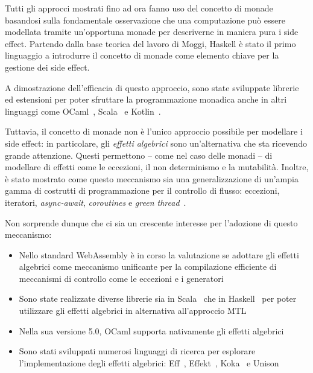 Tutti gli approcci mostrati fino ad ora fanno uso del concetto di monade basandosi sulla fondamentale osservazione che una computazione può essere modellata tramite un'opportuna monade per descriverne in maniera pura i side effect.
Partendo dalla base teorica del lavoro di Moggi, Haskell è stato il primo linguaggio a introdurre il concetto di monade come elemento chiave per la gestione dei side effect.

A dimostrazione dell'efficacia di questo approccio, sono state sviluppate librerie ed estensioni per poter sfruttare la programmazione monadica anche in altri linguaggi come OCaml~\cite{cit:ppx-let}, Scala~\cite{cit:zio,cit:cats} e Kotlin~\cite{cit:arrow-monad-comprehensions}.

Tuttavia, il concetto di monade non è l'unico approccio possibile per modellare i side effect: in particolare, gli \emph{effetti algebrici} sono un'alternativa che sta ricevendo grande attenzione.
Questi permettono -- come nel caso delle monadi -- di modellare di effetti come le eccezioni, il non determinismo e la mutabilità\cite{cit:handlers-of-algebraic-effects}.
Inoltre, è stato mostrato come questo meccanismo sia una generalizzazione di un'ampia gamma di costrutti di programmazione per il controllo di flusso: eccezioni, iteratori, \emph{async-await}, \emph{coroutines} e \emph{green thread}~\cite{cit:algebraic-effect-handlers-go-mainstream}.

Non sorprende dunque che ci sia un crescente interesse per l'adozione di questo meccanismo:
\begin{itemize}
  \item Nello standard WebAssembly è in corso la valutazione se adottare gli effetti algebrici come meccanismo unificante per la compilazione efficiente di meccanismi di controllo come le eccezioni e i generatori~\cite{cit:wasmfx}
  \item Sono state realizzate diverse librerie sia in Scala~\cite{cit:scala-effekt} che in Haskell~\cite{cit:fused-effects,cit:effect-handlers,cit:extensible-effects} per poter utilizzare gli effetti algebrici in alternativa all'approccio MTL
  \item Nella sua versione 5.0, OCaml supporta nativamente gli effetti algebrici~\cite{cit:retrofitting-effect-handlers-onto-ocaml}
  \item Sono stati sviluppati numerosi linguaggi di ricerca per esplorare l'implementazione degli effetti algebrici: Eff~\cite{cit:eff-lang}, Effekt~\cite{cit:effekt-lang}, Koka~\cite{cit:koka-lang} e Unison~\cite{cit:unison-lang}
\end{itemize}
